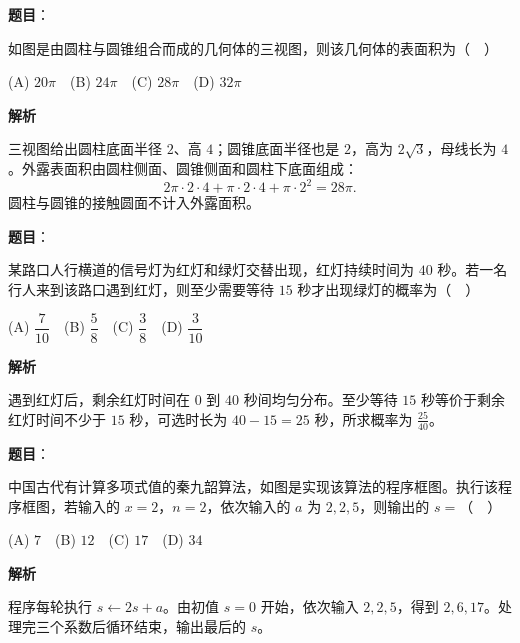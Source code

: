 \begin{answer}

\textbf{题目}：

如图是由圆柱与圆锥组合而成的几何体的三视图，则该几何体的表面积为（　）
\nopagebreak[4]
\begin{center}\end{center}
\nopagebreak[4]
   (A) $20\pi$　(B) $24\pi$　(C) $28\pi$　(D) $32\pi$

\textbf{解析}

三视图给出圆柱底面半径 $2$、高 $4$；圆锥底面半径也是 $2$，高为 $2\sqrt3$，母线长为 $4$。外露表面积由圆柱侧面、圆锥侧面和圆柱下底面组成：
\nopagebreak[4]
\[
2\pi\cdot2\cdot4+\pi\cdot2\cdot4+\pi\cdot2^2=28\pi.
\]
圆柱与圆锥的接触圆面不计入外露面积。


\end{answer}
\begin{answer}

\textbf{题目}：

某路口人行横道的信号灯为红灯和绿灯交替出现，红灯持续时间为 $40$ 秒。若一名行人来到该路口遇到红灯，则至少需要等待 $15$ 秒才出现绿灯的概率为（　）

   (A) $\dfrac7{10}$　(B) $\dfrac58$　(C) $\dfrac38$　(D) $\dfrac3{10}$

\textbf{解析}

遇到红灯后，剩余红灯时间在 $0$ 到 $40$ 秒间均匀分布。至少等待 $15$ 秒等价于剩余红灯时间不少于 $15$ 秒，可选时长为 $40-15=25$ 秒，所求概率为 $\frac{25}{40}$。


\end{answer}
\begin{answer}

\textbf{题目}：

中国古代有计算多项式值的秦九韶算法，如图是实现该算法的程序框图。执行该程序框图，若输入的 $x=2$，$n=2$，依次输入的 $a$ 为 $2,2,5$，则输出的 $s=$（　）
\nopagebreak[4]
\begin{center}\end{center}
\nopagebreak[4]
   (A) $7$　(B) $12$　(C) $17$　(D) $34$

\textbf{解析}

程序每轮执行 $s\leftarrow2s+a$。由初值 $s=0$ 开始，依次输入 $2,2,5$，得到 $2,6,17$。处理完三个系数后循环结束，输出最后的 $s$。


\end{answer}
